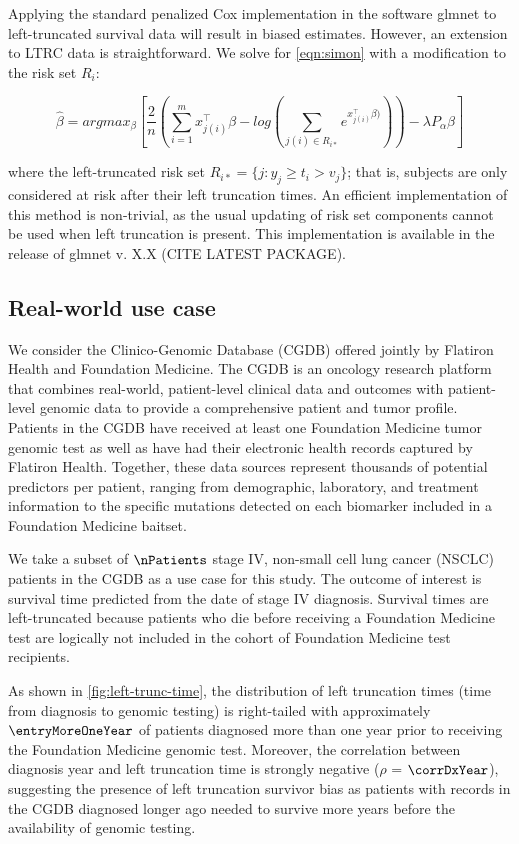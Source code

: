 \documentclass[11pt,final,fleqn]{article}\usepackage[]{graphicx}\usepackage[]{color}
\theoremstyle{plain}
\newcommand{\pkg}[1]{{\fontseries{b}\selectfont #1}}
\begin{document}
Applying the standard penalized Cox implementation in the software \pkg{glmnet} to left-truncated survival data will result in biased estimates. However, an extension to LTRC data is straightforward. We solve for \autoref{eqn:simon} with a modification to the risk set $R_i$:

\begin{equation}
\hat{\beta} = argmax_{\beta}  \left[ \frac{2}{n} \left( \sum_{i=1}^m x_{j(i)}^\intercal\beta - log\left(\sum_{j(i)\in R_{i\ast}}  e^{x_{j(i)}^\intercal\beta)}\right) \right)  - \lambda P_{\alpha}\beta  \right] 
\end{equation}

where the left-truncated risk set $R_{i\ast} = \{ j : y_j \geq t_i > v_j \}$; that is, subjects are only considered at risk after their left truncation times. An efficient implementation of this method is non-trivial, as the usual updating of risk set components cannot be used when left truncation is present. This implementation is available in the release of \pkg{glmnet} v. X.X (CITE LATEST PACKAGE).

\subsection{Real-world use case}
We consider the Clinico-Genomic Database (CGDB) offered jointly by Flatiron Health and Foundation Medicine. The CGDB is an oncology research platform that combines real-world, patient-level clinical data and outcomes with patient-level genomic data to provide a comprehensive patient and tumor profile. Patients in the CGDB have received at least one Foundation Medicine tumor genomic test as well as have had their electronic health records captured by Flatiron Health. Together, these data sources represent thousands of potential predictors per patient, ranging from demographic, laboratory, and treatment information to the specific mutations detected on each biomarker included in a Foundation Medicine baitset. 

We take a subset of $\nPatients$ stage IV, non-small cell lung cancer (NSCLC) patients in the CGDB as a use case for this study. The outcome of interest is survival time predicted from the date of stage IV diagnosis. Survival times are left-truncated because patients who die before receiving a Foundation Medicine test are logically not included in the cohort of Foundation Medicine test recipients. 

As shown in \autoref{fig:left-trunc-time}, the distribution of left truncation times (time from diagnosis to genomic testing) is right-tailed with approximately $\entryMoreOneYear$ of patients diagnosed more than one year prior to receiving the Foundation Medicine genomic test.  Moreover, the correlation between diagnosis year and left truncation time is strongly negative ({$\rho$} = $\corrDxYear$), suggesting the presence of left truncation survivor bias as patients with records in the CGDB diagnosed longer ago needed to survive more years before the availability of genomic testing. 
\end{document}
